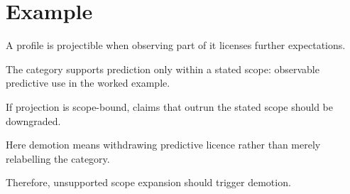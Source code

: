 \section{Example}

A profile is projectible when observing part of it licenses further expectations.

The category supports prediction only within a stated scope: observable predictive use in the worked example.

If projection is scope-bound, claims that outrun the stated scope should be downgraded.

Here demotion means withdrawing predictive licence rather than merely relabelling the category.

Therefore, unsupported scope expansion should trigger demotion.
